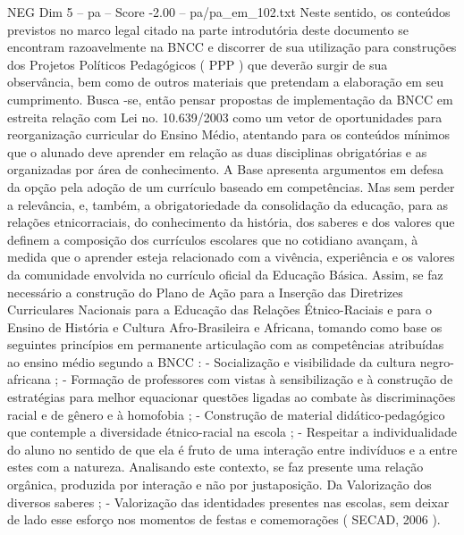 \begin{textsample}{NEG Dim 5 – pa – Score -2.00 – pa/pa\_em\_102.txt}
Neste sentido, os conteúdos previstos no marco legal citado na parte introdutória deste documento se encontram razoavelmente na BNCC e discorrer de sua utilização para construções dos Projetos Políticos Pedagógicos ( PPP ) que deverão surgir de sua observância, bem como de outros materiais que pretendam a elaboração em seu cumprimento.
Busca -se, então pensar propostas de implementação da BNCC em estreita relação com Lei no. 10.639/2003 como um vetor de oportunidades para reorganização curricular do Ensino Médio, atentando para os conteúdos mínimos que o alunado deve aprender em relação as duas disciplinas obrigatórias e as organizadas por área de conhecimento.
A Base apresenta argumentos em defesa da opção pela adoção de um currículo baseado em competências.
Mas sem perder a relevância, e, também, a obrigatoriedade da consolidação da educação, para as relações etnicorraciais, do conhecimento da história, dos saberes e dos valores que definem a composição dos currículos escolares que no cotidiano avançam, à medida que o aprender esteja relacionado com a vivência, experiência e os valores da comunidade envolvida no currículo oficial da Educação Básica.
Assim, se faz necessário a construção do Plano de Ação para a Inserção das Diretrizes Curriculares Nacionais para a Educação das Relações Étnico-Raciais e para o Ensino de História e Cultura Afro-Brasileira e Africana, tomando como base os seguintes princípios em permanente articulação com as competências atribuídas ao ensino médio segundo a BNCC : - Socialização e visibilidade da cultura negro-africana ; - Formação de professores com vistas à sensibilização e à construção de estratégias para melhor equacionar questões ligadas ao combate às discriminações racial e de gênero e à homofobia ; - Construção de material didático-pedagógico que contemple a diversidade étnico-racial na escola ; - Respeitar a individualidade do aluno no sentido de que ela é fruto de uma interação entre indivíduos e a entre estes com a natureza.
Analisando este contexto, se faz presente uma relação orgânica, produzida por interação e não por justaposição.
Da Valorização dos diversos saberes ; - Valorização das identidades presentes nas escolas, sem deixar de lado esse esforço nos momentos de festas e comemorações ( SECAD, 2006 ).

\end{textsample}
